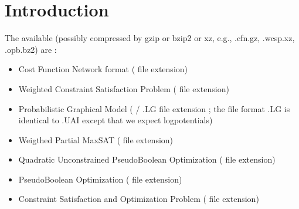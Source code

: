 \documentclass[letterpaper,10pt,openany,oneside,english]{sphinxmanual}
\begin{document}
\section{Introduction}
\label{\detokenize{userdoc:introduction}}
\sphinxAtStartPar
The available  (possibly compressed by gzip or bzip2 or xz, e.g., .cfn.gz, .wcsp.xz, .opb.bz2) are :
\begin{itemize}
\item {} 
\sphinxAtStartPar
Cost Function Network format ({\hyperref[\detokenize{formats/cfnformat:cfn-format}]{}} file extension)

\item {} 
\sphinxAtStartPar
Weighted Constraint Satisfaction Problem ({\hyperref[\detokenize{formats/wcspformat:wcsp-format}]{}} file extension)

\item {} 
\sphinxAtStartPar
Probabilistic Graphical Model ( / .LG file extension ; the file format .LG is identical to .UAI except that we expect log\sphinxhyphen{}potentials)

\item {} 
\sphinxAtStartPar
Weigthed Partial Max\sphinxhyphen{}SAT ( file extension)

\item {} 
\sphinxAtStartPar
Quadratic Unconstrained Pseudo\sphinxhyphen{}Boolean Optimization ({\hyperref[\detokenize{formats/qpboformat:qpbo-format}]{}} file extension)

\item {} 
\sphinxAtStartPar
Pseudo\sphinxhyphen{}Boolean Optimization ( file extension)

\item {} 
\sphinxAtStartPar
Constraint Satisfaction and Optimization Problem ( file extension)

\end{itemize}
\end{document}
